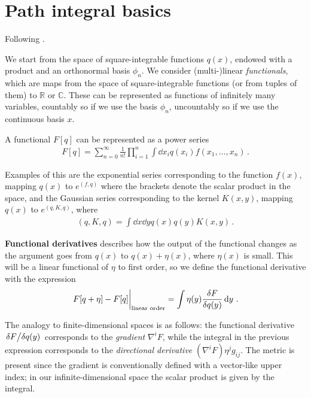 \documentclass[main.tex]{subfiles}
\begin{document}
\section{Path integral basics}

Following \cite[]{zaidiFunctionalMethods1983}.

We start from the space of square-integrable functions \(q(x)\), endowed with a product and an orthonormal basis \(\phi _n\).
We consider (multi-)linear \emph{functionals}, which are maps from the space of square-integrable functions (or from tuples of them) to \(\mathbb{R}\) or \(\mathbb{C}\). 
These can be represented as functions of infinitely many variables, countably so if we use the basis \(\phi _n\), uncountably so if we use the continuous basis \(x\).

A functional \(F[q]\) can be represented as a power series 
%
\begin{align}
F[q] = \sum _{n=0}^{\infty } \frac{1}{n!} \prod_{i=1}^{n} \int \dd{x_i} q(x_i) f(x_1, \dots, x_n)
\,.
\end{align}

Examples of this are the exponential series corresponding to the function \(f(x)\), mapping \(q(x)\) to \(e^{(f, q)}\) where the brackets denote the scalar product in the space, and the Gaussian series corresponding to the kernel \(K(x, y)\), mapping \(q(x)\) to \(e^{(q, K, q)}\), where 
%
\begin{align}
(q, K, q) = \int \dd{x} \dd{y} q(x) q(y) K(x, y)
\,.
\end{align}

\textbf{Functional derivatives} describes how the output of the functional changes as the argument goes from \(q(x)\) to \(q(x) + \eta (x)\), where \(\eta (x)\) is small. 
This will be a linear functional of \(\eta \) to first order, so we define the functional derivative with the expression 
%
\begin{align}
\eval{F[q+\eta ] - F[q]}_{\text{linear order}} = \int \eta (y) \fdv{F}{q (y)} \dd{y}
\,.
\end{align}

The analogy to finite-dimensional spaces is as follows: the functional derivative \(\fdv*{F}{q(y)}\) corresponds to the \emph{gradient} \(\nabla^{i} F\), while the integral in the previous expression corresponds to the \emph{directional derivative} \((\nabla^{i} F) \eta^{j} g_{ij}\).
The metric is present since the gradient is conventionally defined with a vector-like upper index; in our infinite-dimensional space the scalar product is given by the integral.
\end{document}
